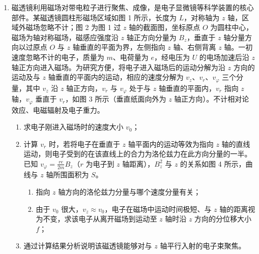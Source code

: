 \documentclass[\gkver]{gaokaozhenti}
\begin{document}
\begin{enumerate}
\item
磁透镜利用磁场对带电粒子进行聚焦、成像，是电子显微镜等科学装置的核心部件。某磁透镜圆柱形磁场区域如图 1 所示，长度为 $L$，对称轴为 $z$ 轴，区域外磁场忽略不计；图 2 为图 1 过 $z$ 轴的截面图，坐标原点 $O$ 为圆柱中心，磁场为轴对称磁场，磁感应强度沿 $z$ 轴正方向分量为 $B_{z}$，垂直于 $z$ 轴分量方向以过原点 $O$ 与 $z$ 轴垂直的平面为界，左侧指向 $z$ 轴、右侧背离 $z$ 轴。一初速度忽略不计的电子，质量为 $m$、电荷量为 $e$，经电压为 $U$ 的电场加速后沿 $z$ 轴正方向进入磁场。为研究方便，将电子进入磁场后的运动分解为沿 $z$ 方向的运动及与 $z$ 轴垂直的平面内的运动，相应的速度分解为 $v_{z}$、$v_{r}$、$v_{\varphi}$ 三个分量，其中 $v_{z}$ 沿 $z$ 轴正方向，$v_{r}$ 与 $v_{\varphi}$ 处于与 $z$ 轴垂直的平面内，$v_{r}$ 指向 $z$ 轴，$v_{\varphi}$ 垂直于 $v_{r}$，如图 3 所示（垂直纸面向外为 $z$ 轴正方向）。不计相对论效应、电磁辐射及电子重力。
\begin{enumerate}
	\item
	求电子刚进入磁场时的速度大小 $v_{0}$；
	\item
	计算 $v_{r}$ 时，若将电子在垂直于 $z$ 轴平面内的运动等效为指向 $z$ 轴的直线运动，则电子受到的在该直线上的合力为洛伦兹力在此方向分量的一半。已知 $v_{\varphi} = \frac{re}{2m}B_{z}$（$r$ 为电子到 $z$ 轴距离），$B_{z}^{2}$ 与 $z$ 的关系如图 4 所示，曲线与 $z$ 轴所围面积为 $S$。
	\begin{enumerate}
		\item
		指向 $z$ 轴方向的洛伦兹力分量与哪个速度分量有关；
		\item
		由于 $v_{0}$ 很大，$v_{z} \approx v_{0}$，电子在磁场中运动时间极短、与 $z$ 轴的距离视为不变，求该电子从离开磁场到运动至 $z$ 轴时沿 $z$ 方向的分位移大小 $f$；
	\end{enumerate}
	\item
	通过计算结果分析说明该磁透镜能够对与 $z$ 轴平行入射的电子束聚焦。
\end{enumerate}
\onepicture[align=right, w=13.00cm]{}
\end{enumerate}
\end{document}
